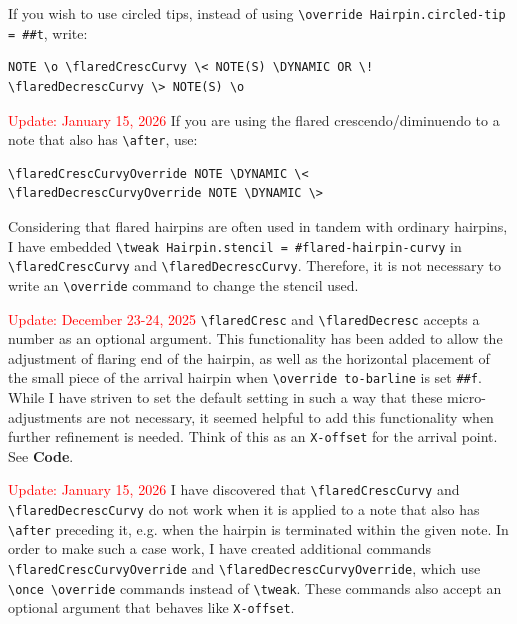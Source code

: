 If you wish to use circled tips, instead of using \verb|\override Hairpin.circled-tip = ##t|, write:

\begin{verbatim}
NOTE \o \flaredCrescCurvy \< NOTE(S) \DYNAMIC OR \! \flaredDecrescCurvy \> NOTE(S) \o
\end{verbatim}

\textcolor{red}{Update: January 15, 2026 } If you are using the flared crescendo/diminuendo to a note that also has \verb|\after|, use:
\begin{verbatim}
\flaredCrescCurvyOverride NOTE \DYNAMIC \< 
\flaredDecrescCurvyOverride NOTE \DYNAMIC \>
\end{verbatim}

Considering that flared hairpins are often used in tandem with ordinary hairpins, I have embedded \verb|\tweak Hairpin.stencil = #flared-hairpin-curvy| in \verb|\flaredCrescCurvy| and \verb|\flaredDecrescCurvy|. Therefore, it is not necessary to write an \verb|\override| command to change the stencil used.

\textcolor{red}{Update: December 23-24, 2025 } \verb|\flaredCresc| and \verb|\flaredDecresc| accepts a number as an optional argument. This functionality has been added to allow the adjustment of flaring end of the hairpin, as well as the horizontal placement of the small piece of the arrival hairpin when \verb|\override to-barline| is set \verb|##f|. While I have striven to set the default setting in such a way that these micro-adjustments are not necessary, it seemed helpful to add this functionality when further refinement is needed. Think of this as an \verb|X-offset| for the arrival point. See \textbf{Code}. 


\textcolor{red}{Update: January 15, 2026 } I have discovered that \verb|\flaredCrescCurvy| and \verb|\flaredDecrescCurvy| do not work when it is applied to a note that also has \verb|\after| preceding it, e.g. when the hairpin is terminated within the given note. In order to make such a case work, I have created additional commands \verb|\flaredCrescCurvyOverride| and  \verb|\flaredDecrescCurvyOverride|, which use \verb|\once \override| commands instead of \verb|\tweak|. These commands also accept an optional argument that behaves like \verb|X-offset|.

